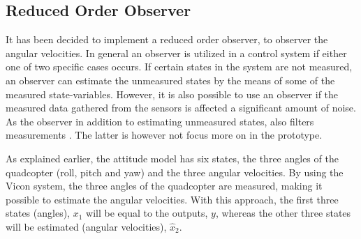 \subsection{Reduced Order Observer}
It has been decided to implement a reduced order observer, to observer the angular velocities. In general an observer is utilized in a control system if either one of two specific cases occurs. If certain states in the system are not measured, an observer can estimate the unmeasured states by the means of some of the measured state-variables. However, it is also possible to use an observer if the measured data gathered from the sensors is affected a significant amount of noise. As the observer in addition to estimating unmeasured states, also filters measurements \cite{observerfilter}. The latter is however not focus more on in the prototype.

As explained earlier, the attitude model has six states, the three angles of the quadcopter (roll, pitch and yaw) and the three angular velocities. By using the Vicon system, the three angles of the quadcopter are measured, making it possible to estimate the angular velocities. With this approach, the first three states (angles), $x_1$ will be equal to the outputs, $y$, whereas the other three states will be estimated (angular velocities), $\hat{x}_2$.

